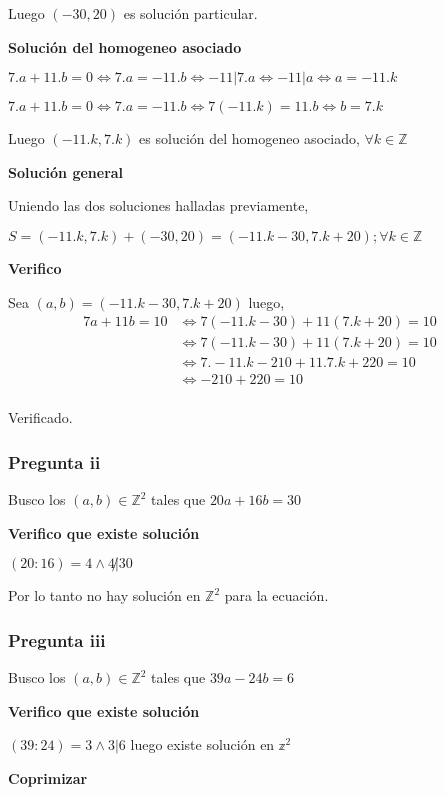 Luego $ (-30,20) $ es solución particular.

\textbf{Solución del homogeneo asociado}

$ 7.a+11.b = 0 \iff 7.a = -11.b \iff -11|7.a \iff -11|a \iff a = -11.k $

$ 7.a+11.b = 0 \iff 7.a = -11.b \iff 7(-11.k) = 11.b \iff b = 7.k$

Luego $ (-11.k, 7.k) $ es solución del homogeneo asociado, $ \forall k \in \mathbb{Z} $

\textbf{Solución general}

Uniendo las dos soluciones halladas previamente,

$ S = (-11.k, 7.k) + (-30,20) = (-11.k-30,7.k+20); \forall k \in \mathbb{Z} $

\textbf{Verifico}

Sea $ (a,b) = (-11.k-30,7.k+20) $ luego,
\begin{align*}
    7a+11b = 10 &\iff 7(-11.k-30) + 11(7.k+20) = 10\\ 
    &\iff 7(-11.k-30) + 11(7.k+20) = 10 \\
    &\iff 7.-11.k-210 + 11.7.k+220 = 10 \\
    &\iff -210 + 220 = 10 \\
\end{align*}

Verificado.

\subsubsection{Pregunta ii}

Busco los $ (a,b) \in \mathbb{Z}^2 $ tales que $ 20a+16b = 30 $

\textbf{Verifico que existe solución}

$ (20:16) = 4 \wedge 4\not | 30 $

Por lo tanto no hay solución en $ \mathbb{Z}^2 $ para la ecuación.

\subsubsection{Pregunta iii}

Busco los $ (a,b) \in \mathbb{Z}^2 $ tales que $ 39a-24b = 6 $

\textbf{Verifico que existe solución}

$ (39:24) = 3 \wedge 3|6 $ luego existe solución en $ \mathbb{z}^2 $

\textbf{Coprimizar}

